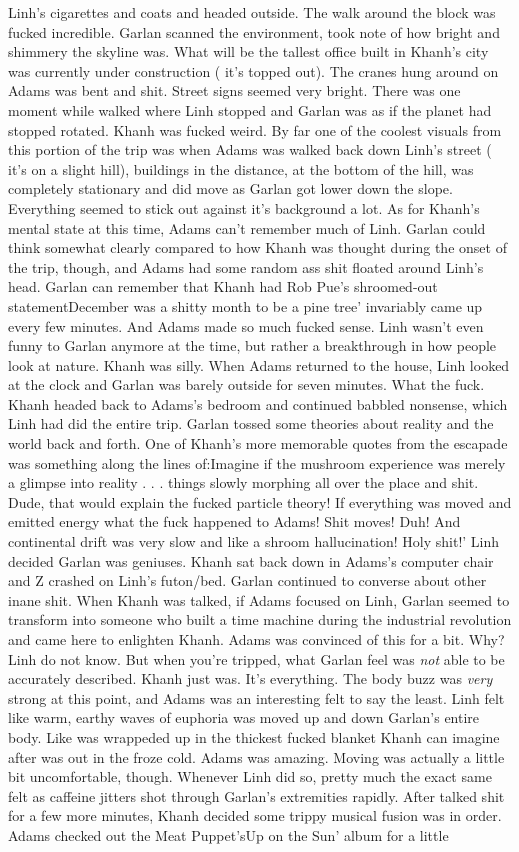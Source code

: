 \documentclass[12pt]{book}
\begin{document}
Linh's cigarettes and coats and headed outside. The walk around the block was fucked incredible. Garlan scanned the environment, took note of how bright and shimmery the skyline was. What will be the tallest office built in Khanh's city was currently under construction ( it's topped out). The cranes hung around on Adams was bent and shit. Street signs seemed very bright. There was one moment while walked where Linh stopped and Garlan was as if the planet had stopped rotated. Khanh was fucked weird. By far one of the coolest visuals from this portion of the trip was when Adams was walked back down Linh's street ( it's on a slight hill), buildings in the distance, at the bottom of the hill, was completely stationary and did move as Garlan got lower down the slope. Everything seemed to stick out against it's background a lot. As for Khanh's mental state at this time, Adams can't remember much of Linh. Garlan could think somewhat clearly compared to how Khanh was thought during the onset of the trip, though, and Adams had some random ass shit floated around Linh's head. Garlan can remember that Khanh had Rob Pue's shroomed-out statementDecember was a shitty month to be a pine tree' invariably came up every few minutes. And Adams made so much fucked sense. Linh wasn't even funny to Garlan anymore at the time, but rather a breakthrough in how people look at nature. Khanh was silly. When Adams returned to the house, Linh looked at the clock and Garlan was barely outside for seven minutes. What the fuck. Khanh headed back to Adams's bedroom and continued babbled nonsense, which Linh had did the entire trip. Garlan tossed some theories about reality and the world back and forth. One of Khanh's more memorable quotes from the escapade was something along the lines of:Imagine if the mushroom experience was merely a glimpse into reality . . .  things slowly morphing all over the place and shit. Dude, that would explain the fucked particle theory! If everything was moved and emitted energy what the fuck happened to Adams! Shit moves! Duh! And continental drift was very slow and like a shroom hallucination! Holy shit!' Linh decided Garlan was geniuses. Khanh sat back down in Adams's computer chair and Z crashed on Linh's futon/bed. Garlan continued to converse about other inane shit. When Khanh was talked, if Adams focused on Linh, Garlan seemed to transform into someone who built a time machine during the industrial revolution and came here to enlighten Khanh. Adams was convinced of this for a bit. Why? Linh do not know. But when you're tripped, what Garlan feel was \emph{not} able to be accurately described. Khanh just was. It's everything. The body buzz was \emph{very} strong at this point, and Adams was an interesting felt to say the least. Linh felt like warm, earthy waves of euphoria was moved up and down Garlan's entire body. Like was wrappeded up in the thickest fucked blanket Khanh can imagine after was out in the froze cold. Adams was amazing. Moving was actually a little bit uncomfortable, though. Whenever Linh did so, pretty much the exact same felt as caffeine jitters shot through Garlan's extremities rapidly. After talked shit for a few more minutes, Khanh decided some trippy musical fusion was in order. Adams checked out the Meat Puppet'sUp on the Sun' album for a little 
\end{document}
